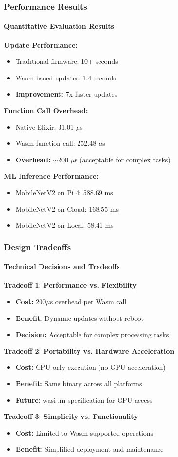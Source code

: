 \documentclass{beamer}
\begin{document}
\begin{frame}
\frametitle{Performance Results}
\framesubtitle{Quantitative Evaluation Results}

\textbf{Update Performance:}
\begin{itemize}
\item Traditional firmware: 10+ seconds
\item Wasm-based updates: 1.4 seconds
\item \textbf{Improvement:} 7x faster updates
\end{itemize}

\textbf{Function Call Overhead:}
\begin{itemize}
\item Native Elixir: 31.01 $\mu$s
\item Wasm function call: 252.48 $\mu$s
\item \textbf{Overhead:} $\sim$200 $\mu$s (acceptable for complex tasks)
\end{itemize}

\textbf{ML Inference Performance:}
\begin{itemize}
\item MobileNetV2 on Pi 4: 588.69 ms
\item MobileNetV2 on Cloud: 168.55 ms
\item MobileNetV2 on Local: 58.41 ms
\end{itemize}
\end{frame}

\begin{frame}
\frametitle{Design Tradeoffs}
\framesubtitle{Technical Decisions and Tradeoffs}

\textbf{Tradeoff 1: Performance vs. Flexibility}
\begin{itemize}
\item \textbf{Cost:} 200$\mu$s overhead per Wasm call
\item \textbf{Benefit:} Dynamic updates without reboot
\item \textbf{Decision:} Acceptable for complex processing tasks
\end{itemize}

\textbf{Tradeoff 2: Portability vs. Hardware Acceleration}
\begin{itemize}
\item \textbf{Cost:} CPU-only execution (no GPU acceleration)
\item \textbf{Benefit:} Same binary across all platforms
\item \textbf{Future:} wasi-nn specification for GPU access
\end{itemize}

\textbf{Tradeoff 3: Simplicity vs. Functionality}
\begin{itemize}
\item \textbf{Cost:} Limited to Wasm-supported operations
\item \textbf{Benefit:} Simplified deployment and maintenance
\end{itemize}
\end{frame}
\end{document}
